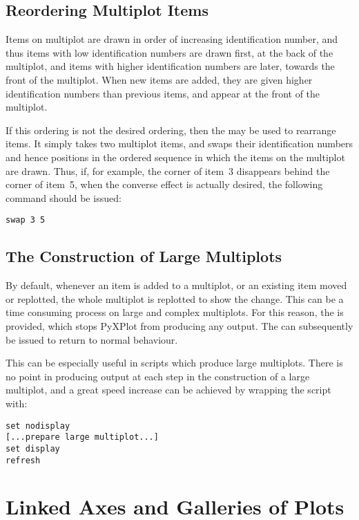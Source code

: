 \subsection{Reordering Multiplot Items}

Items on multiplot are drawn in order of increasing identification number, and
thus items with low identification numbers are drawn first, at the back of the
multiplot, and items with higher identification numbers are later, towards the
front of the multiplot. When new items are added, they are given higher
identification numbers than previous items, and appear at the front of the
multiplot.

If this ordering is not the desired ordering, then the  may be
used to rearrange items. It simply takes two multiplot items, and swaps their
identification numbers and hence positions in the ordered sequence in which the
items on the multiplot are drawn. Thus, if, for example, the corner of item~3
disappears behind the corner of item~5, when the converse effect is actually
desired, the following command should be issued:
\begin{verbatim}
swap 3 5
\end{verbatim}

\subsection{The Construction of Large Multiplots}
\label{sec:set_display}

By default, whenever an item is added to a multiplot, or an existing item moved
or replotted, the whole multiplot is replotted to show the change. This can be
a time consuming process on large and complex multiplots. For this reason, the
 is provided, which stops PyXPlot from producing any
output. The  can subsequently be issued to return to
normal behaviour.

This can be especially useful in scripts which produce large multiplots. There
is no point in producing output at each step in the construction of a large
multiplot, and a great speed increase can be achieved by wrapping the script
with:

\begin{verbatim}
set nodisplay
[...prepare large multiplot...]
set display
refresh
\end{verbatim}

\section{Linked Axes and Galleries of Plots}

